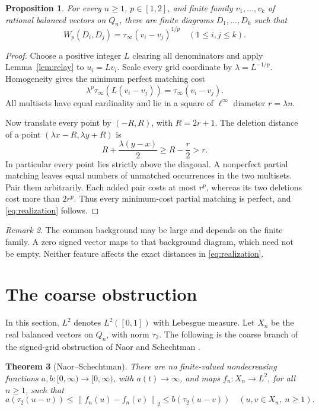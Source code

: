 \documentclass[11pt]{article}
\newtheorem{theorem}{Theorem}
\newtheorem{proposition}[theorem]{Proposition}
\theoremstyle{remark}
\newtheorem{remark}[theorem]{Remark}
\newcommand{\norm}[1]{\left\lVert#1\right\rVert}
\begin{document}
\begin{proposition}\label{prop:realization}
For every \(n\ge1\), \(p\in[1,2]\), and finite family \(v_1,\ldots,v_k\) of rational balanced vectors on \(Q_n\), there are finite diagrams \(D_1,\ldots,D_k\) such that
\begin{equation}
 W_p(D_i,D_j)=\tau_\infty(v_i-v_j)^{1/p}
 \quad(1\le i,j\le k).
 \label{eq:realization}
\end{equation}
\end{proposition}

\begin{proof}
Choose a positive integer \(L\) clearing all denominators and apply Lemma~\ref{lem:relay} to \(u_i=Lv_i\). Scale every grid coordinate by \(\lambda=L^{-1/p}\). Homogeneity gives the minimum perfect matching cost
\[
 \lambda^p\tau_\infty(L(v_i-v_j))=\tau_\infty(v_i-v_j).
\]
All multisets have equal cardinality and lie in a square of \(\ell^\infty\) diameter \(r=\lambda n\).

Now translate every point by \((-R,R)\), with \(R=2r+1\). The deletion distance of a point \((\lambda x-R,\lambda y+R)\) is
\[
 R+\frac{\lambda(y-x)}2\ge R-\frac r2>r.
\]
In particular every point lies strictly above the diagonal. A nonperfect partial matching leaves equal numbers of unmatched occurrences in the two multisets. Pair them arbitrarily. Each added pair costs at most \(r^p\), whereas its two deletions cost more than \(2r^p\). Thus every minimum-cost partial matching is perfect, and \eqref{eq:realization} follows.
\end{proof}

\begin{remark}
The common background may be large and depends on the finite family. A zero signed vector maps to that background diagram, which need not be empty. Neither feature affects the exact distances in \eqref{eq:realization}.
\end{remark}

\section{The coarse obstruction}

In this section, \(L^2\) denotes \(L^2([0,1])\) with Lebesgue measure. Let \(X_n\) be the real balanced vectors on \(Q_n\), with norm \(\tau_2\). The following is the coarse branch of the signed-grid obstruction of Naor and Schechtman \cite[Theorem~3.7]{ns}.

\begin{theorem}[Naor--Schechtman]\label{thm:ns}
There are no finite-valued nondecreasing functions \(a,b:[0,\infty)\to[0,\infty)\), with \(a(t)\to\infty\), and maps \(f_n:X_n\to L^2\), for all \(n\ge1\), such that
\[
 a(\tau_2(u-v))\le\norm{f_n(u)-f_n(v)}_2\le b(\tau_2(u-v))
 \quad(u,v\in X_n,\ n\ge1).
\]
\end{theorem}
\end{document}
